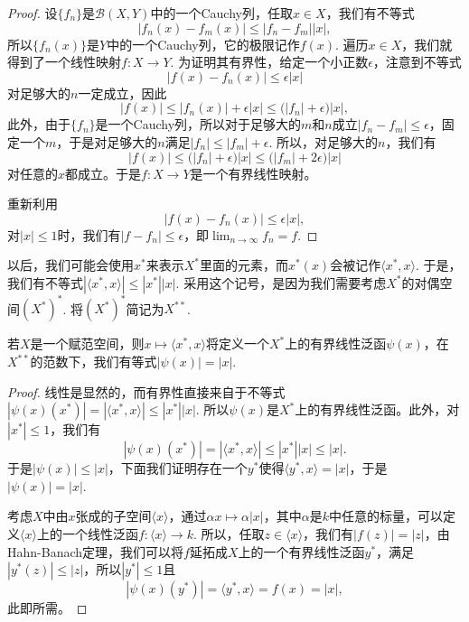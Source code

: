 \begin{proof}
	设$\{f_n\}$是$\mathcal{B}(X,Y)$中的一个Cauchy列，任取$x\in X$，我们有不等式
	\[
	|f_n(x)-f_m(x)|\leq |f_n-f_m||x|,
	\]
	所以$\{f_n(x)\}$是$Y$中的一个Cauchy列，它的极限记作$f(x)$. 遍历$x\in X$，我们就得到了一个线性映射$f:X\to Y$. 为证明其有界性，给定一个小正数$\epsilon$，注意到不等式
	\[
	|f(x)-f_n(x)|\leq \epsilon |x|
	\]
	对足够大的$n$一定成立，因此
	\[
	|f(x)|\leq |f_n(x)|+\epsilon|x|\leq \bigl(|f_n|+\epsilon\bigr) |x|,
	\]
	此外，由于$\{f_n\}$是一个Cauchy列，所以对于足够大的$m$和$n$成立$|f_n-f_m|\leq \epsilon$，固定一个$m$，于是对足够大的$n$满足$|f_n|\leq |f_m|+\epsilon$. 所以，对足够大的$n$，我们有
	\[
	|f(x)|\leq \bigl(|f_n|+\epsilon\bigr) |x|\leq \bigl(|f_m|+2\epsilon\bigr) |x|
	\]
	对任意的$x$都成立。于是$f:X\to Y$是一个有界线性映射。

	重新利用
	\[
	|f(x)-f_n(x)|\leq \epsilon |x|,
	\]
	对$|x|\leq 1$时，我们有$|f-f_n|\leq \epsilon$，即$\lim_{n\to\infty}f_n=f$.
\end{proof}

以后，我们可能会使用$x^*$来表示$X^*$里面的元素，而$x^*(x)$会被记作$\langle x^*,x\rangle$. 于是，我们有不等式$|\langle x^*,x\rangle|\leq |x^*||x|$. 采用这个记号，是因为我们需要考虑$X^*$的对偶空间$(X^*)^*$. 将$(X^*)^*$简记为$X^{**}$.

\begin{lem}
	若$X$是一个赋范空间，则$x\mapsto \langle x^*,x\rangle$将定义一个$X^*$上的有界线性泛函$\psi(x)$，在$X^{**}$的范数下，我们有等式$|\psi(x)|=|x|$.
\end{lem}

\begin{proof}
线性是显然的，而有界性直接来自于不等式$|\psi(x)(x^*)|=|\langle x^*,x\rangle|\leq |x^*||x|$. 所以$\psi(x)$是$X^*$上的有界线性泛函。此外，对$|x^*|\leq 1$，我们有
\[
	|\psi(x)(x^*)|=|\langle x^*,x\rangle|\leq |x^*||x|\leq |x|.
\]
于是$|\psi(x)|\leq |x|$，下面我们证明存在一个$y^*$使得$\langle y^*,x\rangle=|x|$，于是$|\psi(x)|=|x|$.

考虑$X$中由$x$张成的子空间$\langle x\rangle$，通过$\alpha x\mapsto \alpha|x|$，其中$\alpha$是$k$中任意的标量，可以定义$\langle x\rangle$上的一个线性泛函$f:\langle x\rangle\to k$. 所以，任取$z\in \langle x\rangle$，我们有$|f(z)|=|z|$，由Hahn-Banach定理，我们可以将$f$延拓成$X$上的一个有界线性泛函$y^*$，满足$|y^*(z)|\leq |z|$，所以$|y^*|\leq 1$且
\[
	|\psi(x)(y^*)|=\langle y^*,x\rangle = f(x) =|x|,
\]
此即所需。
\end{proof}

